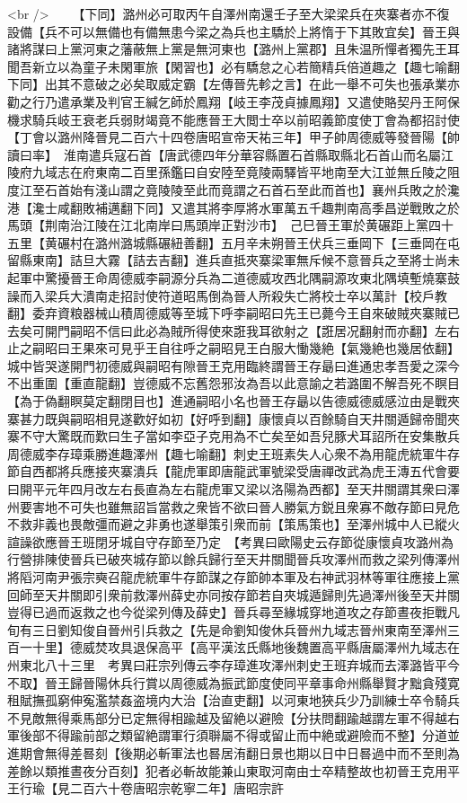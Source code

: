 <br />
　　【下同】潞州必可取丙午自澤州南還壬子至大梁梁兵在夾寨者亦不復設備【兵不可以無備也有備無患今梁之為兵也主驕於上將惰于下其敗宜矣】晉王與諸將謀曰上黨河東之藩蔽無上黨是無河東也【潞州上黨郡】且朱温所憚者獨先王耳聞吾新立以為童子未閑軍旅【閑習也】必有驕怠之心若簡精兵倍道趣之【趣七喻翻下同】出其不意破之必矣取威定霸【左傳晉先軫之言】在此一舉不可失也張承業亦勸之行乃遣承業及判官王緘乞師於鳳翔【岐王李茂貞據鳳翔】又遣使賂契丹王阿保機求騎兵岐王衰老兵弱財竭竟不能應晉王大閲士卒以前昭義節度使丁會為都招討使【丁會以潞州降晉見二百六十四卷唐昭宣帝天祐三年】甲子帥周德威等發晉陽【帥讀曰率】　淮南遣兵寇石首【唐武德四年分華容縣置石首縣取縣北石首山而名屬江陵府九域志在府東南二百里孫鑑曰自安陸至竟陵兩驛皆平地南至大江並無丘陵之阻度江至石首始有淺山謂之竟陵陵至此而竟謂之石首石至此而首也】襄州兵敗之於瀺港【瀺士咸翻敗補邁翻下同】又遣其將李厚將水軍萬五千趣荆南高季昌逆戰敗之於馬頭【荆南治江陵在江北南岸曰馬頭岸正對沙市】　己巳晉王軍於黄碾距上黨四十五里【黄碾村在潞州潞城縣碾紐善翻】五月辛未朔晉王伏兵三垂岡下【三垂岡在屯留縣東南】詰旦大霧【詰去吉翻】進兵直抵夾寨梁軍無斥候不意晉兵之至將士尚未起軍中驚擾晉王命周德威李嗣源分兵為二道德威攻西北隅嗣源攻東北隅填塹燒寨鼓譟而入梁兵大潰南走招討使符道昭馬倒為晉人所殺失亡將校士卒以萬計【校戶教翻】委弃資粮器械山積周德威等至城下呼李嗣昭曰先王已薨今王自來破賊夾寨賊已去矣可開門嗣昭不信曰此必為賊所得使來誑我耳欲射之【誑居况翻射而亦翻】左右止之嗣昭曰王果來可見乎王自往呼之嗣昭見王白服大慟幾絶【氣幾絶也幾居依翻】城中皆哭遂開門初德威與嗣昭有隙晉王克用臨終謂晉王存朂曰進通忠孝吾愛之深今不出重圍【重直龍翻】豈德威不忘舊怨邪汝為吾以此意諭之若潞圍不解吾死不瞑目【為于偽翻瞑莫定翻閉目也】進通嗣昭小名也晉王存朂以告德威德威感泣由是戰夾寨甚力既與嗣昭相見遂歡好如初【好呼到翻】康懷貞以百餘騎自天井關遁歸帝聞夾寨不守大驚既而歎曰生子當如李亞子克用為不亡矣至如吾兒豚犬耳詔所在安集散兵周德威李存璋乘勝進趣澤州【趣七喻翻】刺史王班素失人心衆不為用龍虎統軍牛存節自西都將兵應接夾寨潰兵【龍虎軍即唐龍武軍號梁受唐禪改武為虎王漙五代會要曰開平元年四月改左右長直為左右龍虎軍又梁以洛陽為西都】至天井關謂其衆曰澤州要害地不可失也雖無詔旨當救之衆皆不欲曰晉人勝氣方鋭且衆寡不敵存節曰見危不救非義也畏敵彊而避之非勇也遂舉策引衆而前【策馬策也】至澤州城中人已縱火諠譟欲應晉王班閉牙城自守存節至乃定　【考異曰歐陽史云存節從康懷貞攻潞州為行營排陳使晉兵已破夾城存節以餘兵歸行至天井關聞晉兵攻澤州而救之梁列傳澤州將䧟河南尹張宗奭召龍虎統軍牛存節謀之存節帥本軍及右神武羽林等軍往應接上黨回師至天井關即引衆前救澤州薛史亦同按存節若自夾城遁歸則先過澤州後至天井關豈得已過而返救之也今從梁列傳及薛史】晉兵尋至緣城穿地道攻之存節晝夜拒戰凡旬有三日劉知俊自晉州引兵救之【先是命劉知俊休兵晉州九域志晉州東南至澤州三百一十里】德威焚攻具退保高平【高平漢泫氏縣地後魏置高平縣唐屬澤州九域志在州東北八十三里　考異曰莊宗列傳云李存璋進攻澤州刺史王班弃城而去澤潞皆平今不取】晉王歸晉陽休兵行賞以周德威為振武節度使同平章事命州縣舉賢才黜貪殘寛租賦撫孤窮伸寃濫禁姦盗境内大治【治直吏翻】以河東地狹兵少乃訓練士卒令騎兵不見敵無得乘馬部分已定無得相踰越及留絶以避險【分扶問翻踰越謂左軍不得越右軍後部不得踰前部之類留絶謂軍行須聨屬不得或留止而中絶或避險而不整】分道並進期會無得差晷刻【後期必斬軍法也晷居洧翻日景也期以日中日晷過中而不至則為差餘以類推晝夜分百刻】犯者必斬故能兼山東取河南由士卒精整故也初晉王克用平王行瑜【見二百六十卷唐昭宗乾寧二年】唐昭宗許